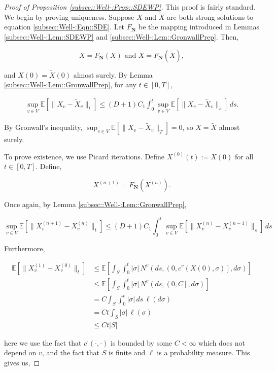 \documentclass[12pt]{article}
\newcommand{\skipLine}{\vspace{12pt}}
\newcommand{\mb}{\mathbb}
\newcommand{\te}{\text}
\newcommand{\ex}[1]{\mb{E}\left[#1\right]}			%
\newcommand{\defeq}{:=}								%
\renewcommand{\v}{v}							%
\renewcommand{\S}{S}							%
\newcommand{\s}{\sigma}							%
\newcommand{\T}{T}								%
\renewcommand{\t}{t}							%
\renewcommand{\tt}{s}							%
\newcommand{\X}{X}								%
\newcommand{\IGr}{c}							%
\newcommand{\vind}[1]{^{#1}}					%
\newcommand{\cind}[1]{_{#1}}					%
\newcommand{\tp}[1]{(#1)}						%
\newcommand{\const}{C}							%
\newcommand{\degr}{D}							%
\newcommand{\sln}[1]{^{(#1)}}					%
\newcommand{\poisses}{\mathbf{N}}				%
\newcommand{\poiss}{N}							%
\newcommand{\Sm}{\ell}							%
\newcommand{\Fpo}{F_{\poisses}}					%
\newcommand{\alt}[1]{\widetilde{#1}}			%
\newcommand{\indx}[1]{_{#1}}					%
\begin{document}
\begin{proof}[Proof of Proposition \ref{subsec::Well-:Prop::SDEWP}]

This proof is fairly standard. We begin by proving uniqueness. Suppose \(\X\) and \(\alt{\X}\) are both strong solutions to equation \ref{subsec::Well-:Eqn::SDE}. Let \(\Fpo\) be the mapping introduced in Lemmas \ref{subsec::Well-:Lem::SDEWP} and \ref{subsec::Well-:Lem::GronwallPrep}. Then,

\[\X = \Fpo(\X)\te{ and } \alt{\X} = \Fpo(\alt{\X}),\]

and \(\X\tp{0} = \alt{\X}\tp{0}\) almost surely. By Lemma \ref{subsec::Well-:Lem::GronwallPrep}, for any \(\t\in [0,\T]\),

\begin{align*}
\sup_{\v\in V}\ex{\|\X\cind{\v} - \alt{\X}\cind{\v}\|_\t} \leq (\degr+1)\const\indx{1}\int_0^\t\sup_{\v\in V} \ex{\|\X\cind{\v} - \alt{\X}\cind{\v}\|_\tt}\,d\tt.
\end{align*}

By Gronwall's inequality, \(\sup_{\v \in V} \ex{\|\X\cind{\v} - \alt{\X}\cind{\v}\|_\T} = 0\), so \(\X = \alt{\X}\) almost surely.

\skipLine

To prove existence, we use Picard iterations. Define \(\X\sln{0}\tp{\t} \defeq \X\tp{0}\) for all \(\t \in [0,\T]\). Define,

\[\X\sln{n+1} = \Fpo(\X\sln{n}).\]

Once again, by Lemma \ref{subsec::Well-:Lem::GronwallPrep},

\[\sup_{\v \in V} \ex{\|\X\sln{n+1}\cind{\v} - \X\sln{n}\cind{\v}\|_\t} \leq (\degr+1)\const\indx{1} \int_0^\t \sup_{\v \in V} \ex{\|\X\sln{n}\cind{\v} - \X\sln{n-1}\cind{\v}\|_\tt}\,d\tt\] 

Furthermore, 

\begin{align*}
\ex{\|\X\sln{1}\cind{\v} - \X\sln{0}\cind{\v}\|_\t} &\leq \ex{\int_\S\int_0^\t |\s|\,\poiss\vind{\v}\left(d\tt,\left(0,\IGr\vind{\v}(\X\tp{0},\s)\right],d\s\right)}\\
&\leq \ex{\int_\S\int_0^\t |\s|\,\poiss\vind{\v}\left(d\tt,\left(0,\const\right],d\s\right)}\\
&= \const\int_\S\int_0^\t |\s|\,d\tt\,\Sm(d\s)\\
&=\const\t\int_\S |\s|\,\Sm(\s)\\
&\leq \const\t|\S|
\end{align*}

here we use the fact that \(\IGr\vind{\cdot}(\cdot,\cdot)\) is bounded by some \(\const < \infty\) which does not depend on \(\v\), and the fact that \(\S\) is finite and \(\Sm\) is a probability measure. This gives us,


\end{proof}
\end{document}
